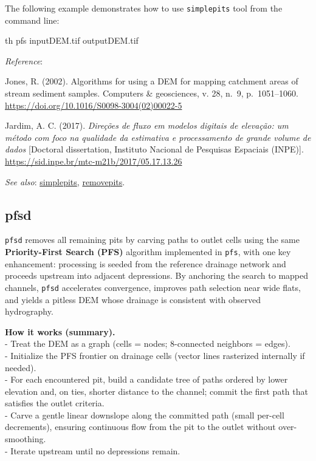 \documentclass[
]{book}
\newenvironment{Shaded}{\begin{snugshade}}{\end{snugshade}}
\newcommand{\ExtensionTok}[1]{#1}
\newcommand{\NormalTok}[1]{#1}
\begin{document}
The following example demonstrates how to use \texttt{simplepits} tool from the command line:

\begin{Shaded}
\begin{Highlighting}[]
\ExtensionTok{th}\NormalTok{ pfs inputDEM.tif outputDEM.tif}
\end{Highlighting}
\end{Shaded}

\emph{Reference}:

Jones, R. (2002). Algorithms for using a DEM for mapping catchment areas of stream sediment samples. Computers \& geosciences, v. 28, n.~9, p.~1051--1060. \url{https://doi.org/10.1016/S0098-3004(02)00022-5}

Jardim, A. C. (2017). \emph{Direções de fluxo em modelos digitais de elevação: um método com foco na qualidade da estimativa e processamento de grande volume de dados} {[}Doctoral dissertation, Instituto Nacional de Pesquisas Espaciais (INPE){]}. \href{http://mtc-m21b.sid.inpe.br/col/sid.inpe.br/mtc-m21b/2017/05.17.13.26/doc/publicacao.pdf?metadatarepository=sid.inpe.br/mtc-m21b/2017/05.17.13.26.57&mirror=sid.inpe.br/mtc-m21b/2013/09.26.14.25.22&languagebutton=en}{https://sid.inpe.br/mtc-m21b/2017/05.17.13.26}

\emph{See also}: \hyperref[simplepits]{simplepits}, \hyperref[removepits]{removepits}.

\subsection{pfsd}\label{pfsd}

\texttt{pfsd} removes all remaining pits by carving paths to outlet cells using the same \textbf{Priority-First Search (PFS)} algorithm implemented in \texttt{pfs}, with one key enhancement: processing is seeded from the reference drainage network and proceeds upstream into adjacent depressions. By anchoring the search to mapped channels, \texttt{pfsd} accelerates convergence, improves path selection near wide flats, and yields a pitless DEM whose drainage is consistent with observed hydrography.

\textbf{How it works (summary).}\\
- Treat the DEM as a graph (cells = nodes; 8-connected neighbors = edges).\\
- Initialize the PFS frontier on drainage cells (vector lines rasterized internally if needed).\\
- For each encountered pit, build a candidate tree of paths ordered by lower elevation and, on ties, shorter distance to the channel; commit the first path that satisfies the outlet criteria.\\
- Carve a gentle linear downslope along the committed path (small per-cell decrements), ensuring continuous flow from the pit to the outlet without over-smoothing.\\
- Iterate upstream until no depressions remain.
\end{document}
